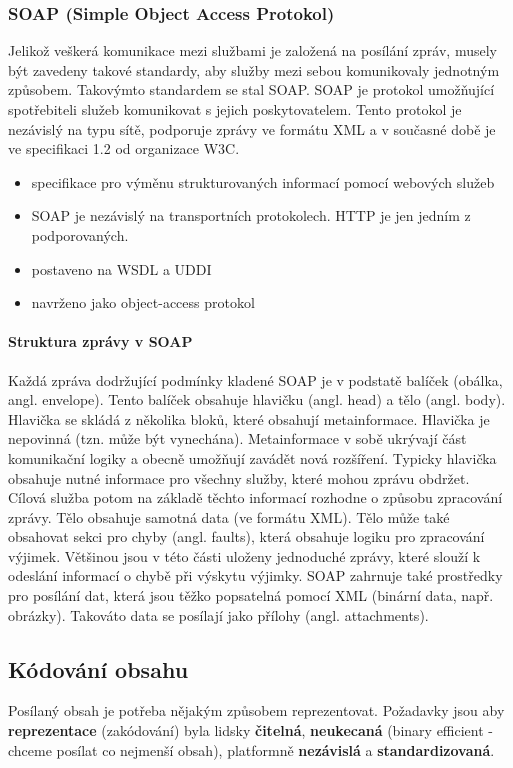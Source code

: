 \subsubsection*{SOAP (Simple Object Access Protokol)}
Jelikož veškerá komunikace mezi službami je založená na posílání zpráv, musely být zavedeny takové standardy, aby služby mezi sebou komunikovaly jednotným způsobem. Takovýmto standardem se stal SOAP. SOAP je protokol umožňující spotřebiteli služeb komunikovat s jejich poskytovatelem. Tento protokol je nezávislý na typu sítě, podporuje zprávy ve formátu XML a v současné době je ve specifikaci 1.2 od organizace W3C.

\begin{itemize}[itemsep=0px]
\item specifikace pro výměnu strukturovaných informací pomocí webových služeb
\item SOAP je nezávislý na transportních protokolech. HTTP je jen jedním z podporovaných.
\item postaveno na WSDL a UDDI
\item navrženo jako object-access protokol
\end{itemize}

\paragraph{Struktura zprávy v SOAP}
Každá zpráva dodržující podmínky kladené SOAP je v podstatě balíček (obálka, angl. envelope). Tento balíček obsahuje hlavičku (angl. head) a tělo (angl. body). Hlavička se skládá z několika bloků, které obsahují metainformace. Hlavička je nepovinná (tzn. může být vynechána). Metainformace v sobě ukrývají část komunikační logiky a obecně umožňují zavádět nová rozšíření. Typicky hlavička obsahuje nutné informace pro všechny služby, které mohou zprávu obdržet. Cílová služba potom na základě těchto informací rozhodne o způsobu zpracování zprávy. Tělo obsahuje samotná data (ve formátu XML). Tělo může také obsahovat sekci pro
chyby (angl. faults), která obsahuje logiku pro zpracování výjimek. Většinou jsou v této části uloženy jednoduché zprávy, které slouží k odeslání informací o chybě při výskytu výjimky. SOAP zahrnuje také prostředky pro posílání dat, která jsou těžko popsatelná pomocí XML (binární data, např. obrázky). Takováto data se posílají jako přílohy (angl. attachments).

\subsection{Kódování obsahu}
Posílaný obsah je potřeba nějakým způsobem reprezentovat. Požadavky jsou aby \textbf{reprezentace} (zakódování) byla lidsky \textbf{čitelná}, \textbf{neukecaná} (binary efficient - chceme posílat co nejmenší obsah), platformně \textbf{nezávislá} a \textbf{standardizovaná}.

